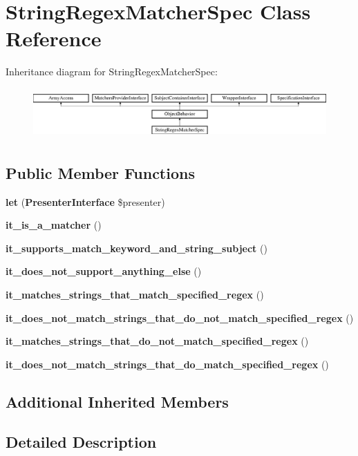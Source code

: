 \section{String\+Regex\+Matcher\+Spec Class Reference}
\label{classspec_1_1_php_spec_1_1_matcher_1_1_string_regex_matcher_spec}
Inheritance diagram for String\+Regex\+Matcher\+Spec\+:\begin{figure}[H]
\begin{center}
\leavevmode
\includegraphics[height=1.953488cm]{classspec_1_1_php_spec_1_1_matcher_1_1_string_regex_matcher_spec}
\end{center}
\end{figure}
\subsection*{Public Member Functions}
\begin{DoxyCompactItemize}
\item 
{\bf let} ({\bf Presenter\+Interface} \$presenter)
\item 
{\bf it\+\_\+is\+\_\+a\+\_\+matcher} ()
\item 
{\bf it\+\_\+supports\+\_\+match\+\_\+keyword\+\_\+and\+\_\+string\+\_\+subject} ()
\item 
{\bf it\+\_\+does\+\_\+not\+\_\+support\+\_\+anything\+\_\+else} ()
\item 
{\bf it\+\_\+matches\+\_\+strings\+\_\+that\+\_\+match\+\_\+specified\+\_\+regex} ()
\item 
{\bf it\+\_\+does\+\_\+not\+\_\+match\+\_\+strings\+\_\+that\+\_\+do\+\_\+not\+\_\+match\+\_\+specified\+\_\+regex} ()
\item 
{\bf it\+\_\+matches\+\_\+strings\+\_\+that\+\_\+do\+\_\+not\+\_\+match\+\_\+specified\+\_\+regex} ()
\item 
{\bf it\+\_\+does\+\_\+not\+\_\+match\+\_\+strings\+\_\+that\+\_\+do\+\_\+match\+\_\+specified\+\_\+regex} ()
\end{DoxyCompactItemize}
\subsection*{Additional Inherited Members}


\subsection{Detailed Description}


